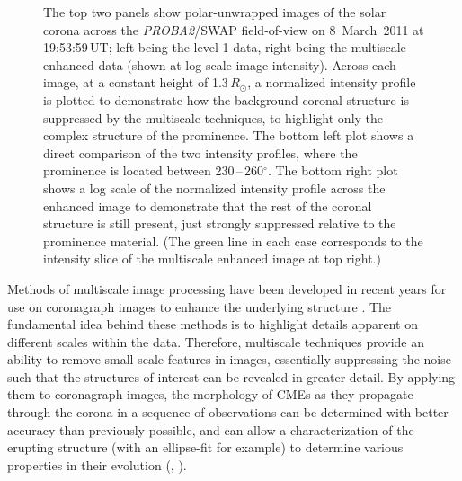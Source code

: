 \documentclass[namedreferences]{solarphysics}
\begin{document}
\begin{article}
\begin{figure}[t]
\caption{The top two panels show polar-unwrapped images of the solar corona across the \emph{PROBA2}/SWAP field-of-view on 8~March~2011 at 19:53:59\,UT; left being the level-1 data, right being the multiscale enhanced data (shown at log-scale image intensity). Across each image, at a constant height of 1.3\,$R_{\odot}$, a normalized intensity profile is plotted to demonstrate how the background coronal structure is suppressed by the multiscale techniques, to highlight only the complex structure of the prominence. The bottom left plot shows a direct comparison of the two intensity profiles, where the prominence is located between 230\,--\,260$^\circ$. The bottom right plot shows a log scale of the normalized intensity profile across the enhanced image to demonstrate that the rest of the coronal structure is still present, just strongly suppressed relative to the prominence material. (The green line in each case corresponds to the intensity slice of the multiscale enhanced image at top right.)}
\label{polar_fig_swap_20110308}
\end{figure}

Methods of multiscale image processing have been developed in recent years for use on coronagraph images to enhance the underlying structure \cite{2011AdSpR..47.2118G,2008ApJ...674.1201S}. The fundamental idea behind these methods is to highlight details apparent on different scales within the data. Therefore, multiscale techniques provide an ability to remove small-scale features in images, essentially suppressing the noise such that the structures of interest can be revealed in greater detail. By applying them to coronagraph images, the morphology of CMEs as they propagate through the corona in a sequence of observations can be determined with better accuracy than previously possible, and can allow a characterization of the erupting structure (with an ellipse-fit for example) to determine various properties in their evolution (, \citeyear{2012ApJ...752..145B}). %


\end{article}
\end{document}
